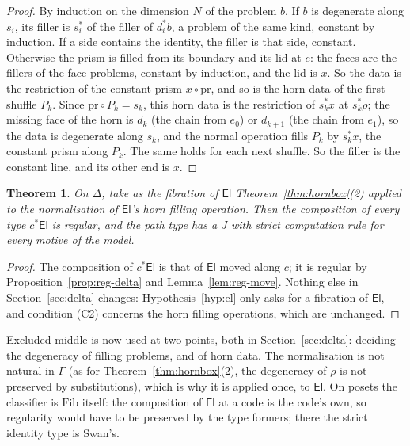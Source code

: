 \documentclass[11pt]{article}
\newcommand{\El}{\mathsf{El}}
\newcommand{\Fib}{\mathrm{Fib}}
\theoremstyle{plain}
\newtheorem{theorem}{Theorem}[section]
\theoremstyle{definition}
\theoremstyle{remark}
\begin{document}
\begin{proof}
By induction on the dimension $N$ of the problem $b$. If $b$ is
degenerate along $s_i$, its filler is $s_i^*$ of the filler of $d_i^*b$,
a problem of the same kind, constant by induction. If a side contains the
identity, the filler is that side, constant. Otherwise the prism is
filled from its boundary and its lid at $e$: the faces are the fillers of
the face problems, constant by induction, and the lid is $x$. So the data
is the restriction of the constant prism $x\circ\mathrm{pr}$, and so is
the horn data of the first shuffle $P_k$. Since $\mathrm{pr}\circ P_k=s_k$,
this horn data is the restriction of $s_k^*x$ at $s_k^*\rho$; the missing
face of the horn is $d_k$ (the chain from $e_0$) or $d_{k+1}$ (the chain
from $e_1$), so the data is degenerate along $s_k$, and the normal
operation fills $P_k$ by $s_k^*x$, the constant prism along $P_k$. The
same holds for each next shuffle. So the filler is the constant line, and
its other end is $x$.
\end{proof}

\begin{theorem}\label{thm:path-j-delta}
On $\Delta$, take as the fibration of $\El$ Theorem~\ref{thm:hornbox}(2)
applied to the normalisation of $\El$'s horn filling operation. Then the
composition of every type $c^*\El$ is regular, and the path type has a
$J$ with strict computation rule for every motive of the model.
\end{theorem}

\begin{proof}
The composition of $c^*\El$ is that of $\El$ moved along $c$; it is
regular by Proposition~\ref{prop:reg-delta} and Lemma~\ref{lem:reg-move}.
Nothing else in Section~\ref{sec:delta} changes: Hypothesis~\ref{hyp:el}
only asks for a fibration of $\El$, and condition (C2) concerns the horn
filling operations, which are unchanged.
\end{proof}

Excluded middle is now used at two points, both in Section~\ref{sec:delta}:
deciding the degeneracy of filling problems, and of horn data. The
normalisation is not natural in $\Gamma$ (as for
Theorem~\ref{thm:hornbox}(2), the degeneracy of $\rho$ is not preserved
by substitutions), which is why it is applied once, to $\El$. On posets
the classifier is $\Fib$ itself: the composition of $\El$ at a code is the
code's own, so regularity would have to be preserved by the type formers;
there the strict identity type is Swan's.
\end{document}
